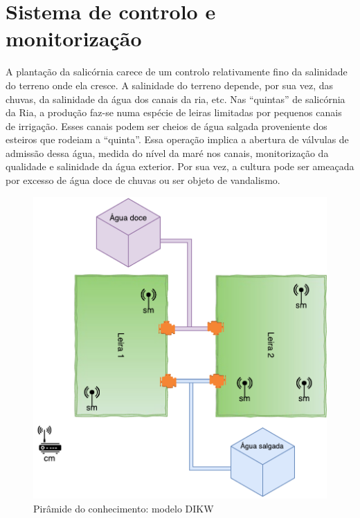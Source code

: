 

\chapter{Sistema de controlo e monitorização}


A plantação da salicórnia carece de um controlo relativamente fino da salinidade do terreno onde ela cresce. A salinidade do terreno depende, por sua vez, das chuvas, da salinidade da água dos canais da ria, etc. Nas “quintas” de salicórnia da Ria, a produção faz-se numa espécie de leiras limitadas por pequenos canais de irrigação. Esses canais podem ser cheios de água salgada proveniente dos esteiros que rodeiam a “quinta”. Essa operação implica a abertura de válvulas de admissão dessa água, medida do nível da maré nos canais, monitorização da qualidade e salinidade da água exterior.
Por sua vez, a cultura pode ser ameaçada por excesso de água doce de chuvas ou ser objeto de vandalismo.





\begin{figure}[!htb]
	\centering
	\includegraphics[scale=0.55]{esquemas/leiras-comm-geral.pdf}
	\caption{Pirâmide do conhecimento: modelo DIKW}
	\label{dikw}
\end{figure}


